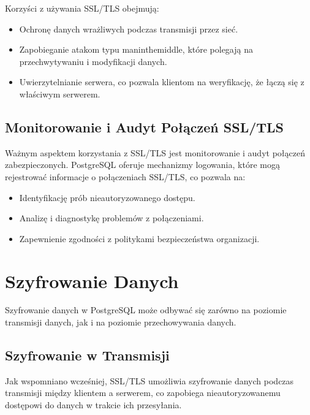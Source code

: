 \documentclass[letterpaper,10pt,polish]{sphinxmanual}
\begin{document}
\sphinxAtStartPar
Korzyści z używania SSL/TLS obejmują:
\begin{itemize}
\item {} 
\sphinxAtStartPar
Ochronę danych wrażliwych podczas transmisji przez sieć.

\item {} 
\sphinxAtStartPar
Zapobieganie atakom typu man\sphinxhyphen{}in\sphinxhyphen{}the\sphinxhyphen{}middle, które polegają na
przechwytywaniu i modyfikacji danych.

\item {} 
\sphinxAtStartPar
Uwierzytelnianie serwera, co pozwala klientom na weryfikację, że
łączą się z właściwym serwerem.

\end{itemize}


\section{Monitorowanie i Audyt Połączeń SSL/TLS}
\label{\detokenize{sprawozdanie/source/rozdzialy/rozdzial4:monitorowanie-i-audyt-polaczen-ssl-tls}}
\sphinxAtStartPar
Ważnym aspektem korzystania z SSL/TLS jest monitorowanie i audyt
połączeń zabezpieczonych. PostgreSQL oferuje mechanizmy logowania, które
mogą rejestrować informacje o połączeniach SSL/TLS, co pozwala na:
\begin{itemize}
\item {} 
\sphinxAtStartPar
Identyfikację prób nieautoryzowanego dostępu.

\item {} 
\sphinxAtStartPar
Analizę i diagnostykę problemów z połączeniami.

\item {} 
\sphinxAtStartPar
Zapewnienie zgodności z politykami bezpieczeństwa organizacji.

\end{itemize}

\sphinxstepscope


\chapter{Szyfrowanie Danych}
\label{\detokenize{sprawozdanie/source/rozdzialy/rozdzial5:szyfrowanie-danych}}\label{\detokenize{sprawozdanie/source/rozdzialy/rozdzial5::doc}}
\sphinxAtStartPar
Szyfrowanie danych w PostgreSQL może odbywać się zarówno na poziomie
transmisji danych, jak i na poziomie przechowywania danych.


\section{Szyfrowanie w Transmisji}
\label{\detokenize{sprawozdanie/source/rozdzialy/rozdzial5:szyfrowanie-w-transmisji}}
\sphinxAtStartPar
Jak wspomniano wcześniej, SSL/TLS umożliwia szyfrowanie danych podczas
transmisji między klientem a serwerem, co zapobiega nieautoryzowanemu
dostępowi do danych w trakcie ich przesyłania.
\end{document}
